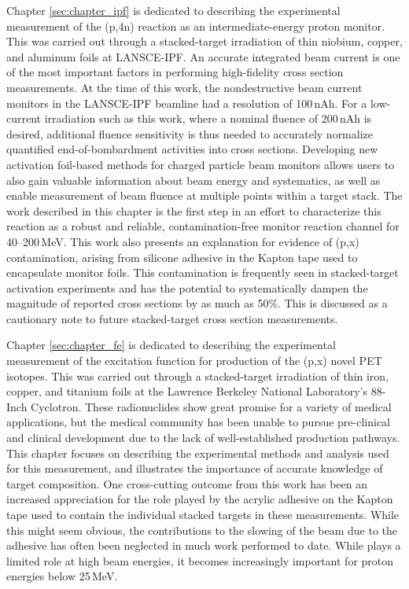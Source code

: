 Chapter \ref{sec:chapter_ipf} is dedicated to describing the experimental measurement of the (p,4n) reaction as an intermediate-energy proton monitor.
This was carried out through a stacked-target irradiation of thin niobium, copper, and aluminum foils at LANSCE-IPF.
An accurate integrated beam current is one of the most important factors in performing high-fidelity cross section measurements.
At the time of this work, the nondestructive beam current monitors in the LANSCE-IPF beamline had a  resolution of 100\,nAh.
For a low-current irradiation such as this work, where a nominal fluence of 200\,nAh is desired, additional fluence sensitivity is thus needed to accurately normalize quantified end-of-bombardment activities into cross sections.
Developing  new activation foil-based methods for charged particle beam monitors allows users to also gain valuable information about beam energy and systematics, as well as enable measurement of beam fluence at multiple points within a target stack.
The work described in this chapter is the first step in an effort to characterize this reaction as a robust and reliable, contamination-free monitor reaction channel for 40--200\,MeV.
This work also presents an explanation for evidence of (p,x) contamination, arising from silicone adhesive in the Kapton tape used to encapsulate monitor foils. 
This contamination is frequently seen in stacked-target activation experiments and has the potential to systematically dampen the magnitude of reported cross sections by as much as 50\%. 
This is discussed as a cautionary note to future stacked-target cross section measurements.



Chapter \ref{sec:chapter_fe} is dedicated to describing the experimental measurement of the excitation function for production of the  (p,x) novel PET isotopes.
This was carried out through a stacked-target irradiation of thin iron, copper, and titanium foils at the Lawrence Berkeley National Laboratory's 88-Inch Cyclotron.
These radionuclides show great promise for a variety of medical applications, but the medical community has been unable to pursue pre-clinical and clinical development due to the lack of well-established production pathways.
This chapter focuses on describing the experimental methods and analysis used for this measurement, and illustrates the importance of accurate knowledge of target composition.
One cross-cutting outcome from this work has been an increased appreciation for the role played by the acrylic adhesive on the Kapton tape used to contain the individual stacked targets in these measurements. 
While this might seem obvious, the contributions to the slowing of the beam due to the adhesive has often been neglected in much work performed to date. 
While plays a limited role at high beam energies, it becomes increasingly important for proton energies below 25\,MeV. 



